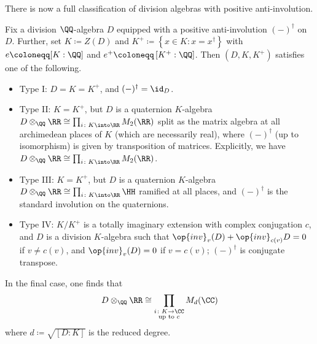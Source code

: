 \documentclass[../notes.tex]{subfiles}
\begin{document}
There is now a full classification of division algebras with positive anti-involution.
\begin{theorem}[Albert] \label{thm:albert}
	Fix a division $\QQ$-algebra $D$ equipped with a positive anti-involution $(-)^\dagger$ on $D$. Further, set $K\coloneqq Z(D)$ and $K^+\coloneqq\left\{x\in K:x=x^\dagger\right\}$ with $e\coloneqq[K:\QQ]$ and $e^+\coloneqq\left[K^+:\QQ\right]$. Then $(D,K,K^+)$ satisfies one of the following.
	\begin{itemize}
		\item Type I: $D=K=K^+$, and $(-)^\dagger=\id_D$.
		\item Type II: $K=K^+$, but $D$ is a quaternion $K$-algebra $D\otimes_\QQ\RR\cong\prod_{i\colon K\into\RR}M_2(\RR)$ split as the matrix algebra at all archimedean places of $K$ (which are necessarily real), where $(-)^\dagger$ (up to isomorphism) is given by transposition of matrices. Explicitly, we have $D\otimes_\QQ\RR\cong\prod_{i\colon K\into\RR}M_2(\RR)$.
		\item Type III: $K=K^+$, but $D$ is a quaternion $K$-algebra $D\otimes_\QQ\RR\cong\prod_{i\colon K\into\RR}\HH$ ramified at all places, and $(-)^\dagger$ is the standard involution on the quaternions.
		\item Type IV: $K/K^+$ is a totally imaginary extension with complex conjugation $c$, and $D$ is a division $K$-algebra such that $\op{inv}_v(D)+\op{inv}_{c(v)}D=0$ if $v\ne c(v)$, and $\op{inv}_v(D)=0$ if $v=c(v)$; $(-)^\dagger$ is conjugate transpose.
	\end{itemize}
\end{theorem}
\begin{remark}
	In the final case, one finds that
	\[D\otimes_\QQ\RR\cong\prod_{\substack{i\colon K\to\CC\\\text{up to }c}}M_d(\CC)\]
	where $d\coloneqq\sqrt{[D:K]}$ is the reduced degree.
\end{remark}
\end{document}
